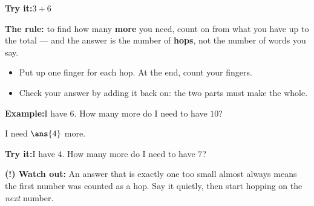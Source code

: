 \documentclass[12pt]{article}
\begin{document}
\begin{tryitbox}
\textbf{Try it:}\quad $3 + 6$\\[2pt]
\end{tryitbox}


\begin{formulabox}
\textbf{The rule:} to find how many \textbf{more} you need, count on from what
you have up to the total --- and the answer is the number of \textbf{hops}, not
the number of words you say.
\begin{itemize}[leftmargin=0.8cm, itemsep=1pt, topsep=2pt]
  \item Put up one finger for each hop. At the end, count your fingers.
  \item Check your answer by adding it back on: the two parts must make the
        whole.
\end{itemize}
\end{formulabox}

\begin{examplebox}
\textbf{Example:}\quad I have $6$. How many more do I need to have $10$?

I need $\ans{4}$ more.
\end{examplebox}

\begin{tryitbox}
\textbf{Try it:}\quad I have $4$. How many more do I need to have $7$?\\[2pt]
\end{tryitbox}

\begin{watchoutbox}
\textbf{(!) Watch out:} An answer that is exactly one too small almost always
means the first number was counted as a hop. Say it quietly, then start hopping
on the \emph{next} number.
\end{watchoutbox}
\end{document}
